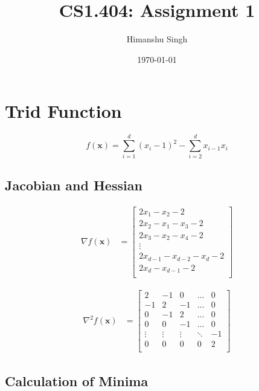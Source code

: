 \documentclass[a4paper]{article}
\title{CS1.404: Assignment 1}
\author{Himanshu Singh}
\date{\today}
\begin{document}
\maketitle

\section{Trid Function}

$$f(\textbf{x}) = \sum_{i=1}^d (x_i - 1)^2 - \sum_{i=2}^d x_{i-1} x_i$$

\subsection{Jacobian and Hessian}

\begin{align*}
\nabla f(\textbf{x}) &=
    \begin{bmatrix}
        2 x_1 - x_2 - 2 \\
        2 x_2 - x_1 - x_3 - 2 \\
        2 x_3 - x_2 - x_4 - 2 \\
        \vdots \\
        2 x_{d-1} - x_{d-2} - x_d - 2 \\
        2 x_d - x_{d-1} - 2 \\
    \end{bmatrix}
\end{align*}

\begin{align*}
\nabla^2 f(\textbf{x}) &=
    \begin{bmatrix}
        2 & -1 & 0 & \dots & 0 \\
        -1 & 2 & -1 & \dots & 0 \\
        0 & -1 & 2 & \dots & 0 \\
        0 & 0 & -1 & \dots & 0 \\
        \vdots & \vdots & \vdots & \ddots & -1 \\
        0 & 0 & 0 & 0 & 2 \\
    \end{bmatrix}
\end{align*}

\subsection{Calculation of Minima}
\end{document}

